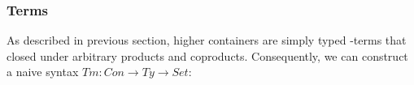 \begin{code}[hide]%
\>[0]\AgdaSpace{}%
\AgdaSpace{}%
\AgdaSpace{}%
\AgdaSymbol{:}\AgdaSpace{}%
\AgdaSpace{}%
\AgdaSpace{}%
\<%
\end{code}

\subsubsection*{Terms}

As described in previous section, higher containers are simply typed \lambda-terms that closed under arbitrary products and coproducts. Consequently, we can construct a naive syntax $Tm : Con \to Ty \to Set$:

\begin{code}[hide]%
\>[0]\AgdaSpace{}%
\AgdaSpace{}%
\AgdaSymbol{:}\AgdaSpace{}%
\<%
\end{code}

